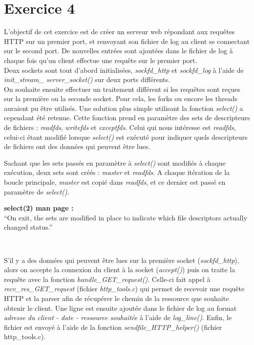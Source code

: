 \section{Exercice 4}
L'objectif de cet exercice est de créer un serveur web répondant aux requêtes HTTP sur un premier port, et renvoyant son fichier de log au client se connectant sur le second port. De nouvelles entrées sont ajoutées dans le fichier de log à chaque fois qu'un client effectue une requête sur le premier port.\\

Deux sockets sont tout d'abord initialisées, \emph{sockfd\_http} et \emph{sockfd\_log} à l'aide de \emph{init\_stream\_ server\_socket()} sur deux ports différents.\\

On souhaite ensuite effectuer un traitement différent si les requêtes sont reçues sur la première ou la seconde socket. Pour cela, les forks ou encore les threads auraient pu être utilisés. Une solution plus simple utilisant la fonction \emph{select()} a cependant été retenue. Cette fonction prend en paramètre des sets de descripteurs de fichiers : \emph{readfds}, \emph{writefds} et \emph{exceptfds}. Celui qui nous intéresse est \emph{readfds}, celui-ci étant modifié lorsque \emph{select()} est exécuté pour indiquer quels descripteurs de fichiers ont des données qui peuvent être lues.\\

\begin{mdframed}[backgroundcolor=lightblue, linecolor=darkblue]
Sachant que les sets passés en paramètre à \emph{select()} sont modifiés à chaque exécution, deux sets sont créés : \emph{master} et \emph{readfds}. A chaque itération de la boucle principale, \emph{master} est copié dans \emph{readfds}, et ce dernier est passé en paramètre de \emph{select()}.

\begin{mdframed}[backgroundcolor=lightblue2, linecolor=darkblue]
\textbf{select(2) man page :}\\
``On exit, the sets are modified in place to indicate which file descriptors actually changed status.''
\end{mdframed}
\end{mdframed}
\

S'il y a des données qui peuvent être lues sur la première socket (\emph{sockfd\_http}), alors on accepte la connexion du client à la socket (\emph{accept()}) puis on traite la requête avec la fonction \emph{handle\_GET\_request()}. Celle-ci fait appel à \emph{recv\_res\_GET\_request} (fichier \emph{http\_tools.c}) qui permet de recevoir une requête HTTP et la parser afin de récupérer le chemin de la ressource que souhaite obtenir le client. Une ligne est ensuite ajoutée dans le fichier de log au format \emph{adresse du client - date - ressource souhaitée} à l'aide de \emph{log\_line()}. Enfin, le fichier est envoyé à l'aide de la fonction \emph{sendfile\_HTTP\_helper()} (fichier http\_tools.c).\\

